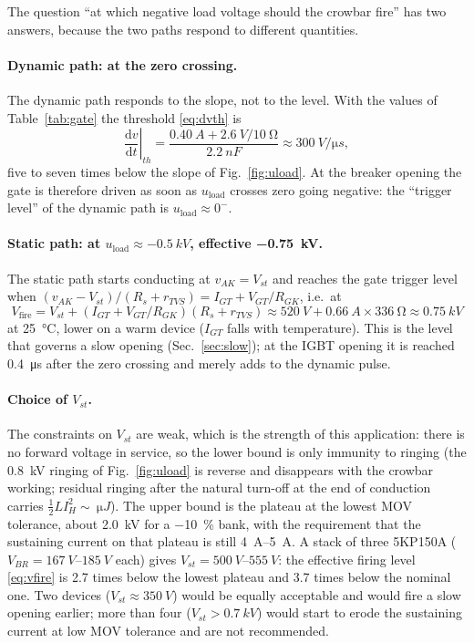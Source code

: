 \documentclass[11pt,a4paper]{article}
\begin{document}
The question ``at which negative load voltage should the crowbar fire'' has two answers,
because the two paths respond to different quantities.

\paragraph{Dynamic path: at the zero crossing.} The dynamic path responds to the slope, not to
the level. With the values of Table~\ref{tab:gate} the threshold \eqref{eq:dvth} is
\begin{equation}
  \left.\frac{\mathrm{d}v}{\mathrm{d}t}\right|_{th}
  = \frac{\SI{0.40}{A} + \SI{2.6}{V}/\SI{10}{\ohm}}{\SI{2.2}{nF}} \approx \SI{300}{V/\micro s},
\end{equation}
five to seven times below the slope of Fig.~\ref{fig:uload}. At the breaker opening the gate is
therefore driven as soon as $u_{\mathrm{load}}$ crosses zero going negative: the ``trigger
level'' of the dynamic path is $u_{\mathrm{load}} \approx 0^-$.

\paragraph{Static path: at $u_{\mathrm{load}} \approx \SI{-0.5}{kV}$, effective
\SI{-0.75}{kV}.} The static path starts conducting at $v_{AK} = V_{st}$ and reaches the gate
trigger level when $(v_{AK} - V_{st})/(R_s + r_{TVS}) = I_{GT} + V_{GT}/R_{GK}$, i.e.\ at
\begin{equation}
  V_{\mathrm{fire}} = V_{st} + (I_{GT} + V_{GT}/R_{GK})(R_s + r_{TVS})
  \approx \SI{520}{V} + \SI{0.66}{A}\times\SI{336}{\ohm} \approx \SI{0.75}{kV}
  \label{eq:vfire}
\end{equation}
at \SI{25}{\celsius}, lower on a warm device ($I_{GT}$ falls with temperature). This is the level
that governs a slow opening (Sec.~\ref{sec:slow}); at the IGBT opening it is reached
\SI{0.4}{\micro s} after the zero crossing and merely adds to the dynamic pulse.

\paragraph{Choice of $V_{st}$.} The constraints on $V_{st}$ are weak, which is the strength of
this application: there is no forward voltage in service, so the lower bound is only immunity to
ringing (the \SI{+0.8}{kV} ringing of Fig.~\ref{fig:uload} is reverse and disappears with the
crowbar working; residual ringing after the natural turn-off at the end of conduction carries
$\tfrac12 L I_H^2 \sim \SI{}{\micro J}$). The upper bound is the plateau at the lowest MOV
tolerance, about \SI{2.0}{kV} for a \SI{-10}{\percent} bank, with the requirement that the
sustaining current on that plateau is still \SIrange{4}{5}{A}. A stack of three 5KP150A
($V_{BR} = \SIrange{167}{185}{V}$ each) gives $V_{st} = \SIrange{500}{555}{V}$: the effective
firing level \eqref{eq:vfire} is \SI{2.7}{} times below the lowest plateau and \SI{3.7}{} times
below the nominal one. Two devices ($V_{st} \approx \SI{350}{V}$) would be equally acceptable
and would fire a slow opening earlier; more than four ($V_{st} > \SI{0.7}{kV}$) would start to
erode the sustaining current at low MOV tolerance and are not recommended.
\end{document}
